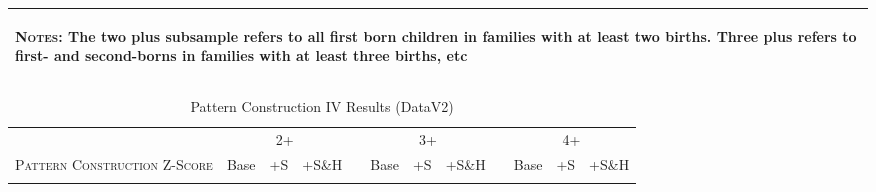 \begin{landscape}
\begin{table}[htpb!]
\begin{center}
\begin{tabular}{lcccp{2mm}cccp{2mm}ccc}
\midrule\multicolumn{12}{p{19.2cm}}{\begin{footnotesize}\textsc{Notes:} The two plus subsample refers to all first born children in families with at least two births.  Three plus refers to first- and second-borns in families with at least three births, etc\end{footnotesize}} \\ \bottomrule 
\end{tabular}\end{center}\end{table}\end{landscape}\begin{landscape}\begin{table}[htpb!]\caption{Pattern Construction IV Results (DataV2)}
\label{TWINtab:IVAll}
\begin{center}\begin{tabular}{lcccp{2mm}cccp{2mm}ccc}
\toprule \toprule 
&\multicolumn{3}{c}{2+}&&\multicolumn{3}{c}{3+}&&\multicolumn{3}{c}{4+}\\ \cmidrule(r){2-4} \cmidrule(r){6-8} \cmidrule(r){10-12} 
\textsc{Pattern Construction Z-Score}&Base&+S&+S\&H&&Base&+S&+S\&H&&Base&+S&+S\&H\\ \midrule 
\begin{footnotesize}\end{footnotesize}& 
\begin{footnotesize}\end{footnotesize}& 
\begin{footnotesize}\end{footnotesize}& 
\begin{footnotesize}\end{footnotesize}& 
\begin{footnotesize}\end{footnotesize}& 
\begin{footnotesize}\end{footnotesize}& 
\begin{footnotesize}\end{footnotesize}& 
\begin{footnotesize}\end{footnotesize}& 
\begin{footnotesize}\end{footnotesize}& 
\begin{footnotesize}\end{footnotesize}& 
\begin{footnotesize}\end{footnotesize}& 

\end{tabular}
\end{center}
\end{table}
\end{landscape}
